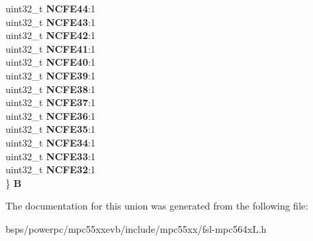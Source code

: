 \begin{DoxyCompactItemize}
\begin{tabbing}
\>uint32\_t {\bfseries NCFE44}:1\\
\>uint32\_t {\bfseries NCFE43}:1\\
\>uint32\_t {\bfseries NCFE42}:1\\
\>uint32\_t {\bfseries NCFE41}:1\\
\>uint32\_t {\bfseries NCFE40}:1\\
\>uint32\_t {\bfseries NCFE39}:1\\
\>uint32\_t {\bfseries NCFE38}:1\\
\>uint32\_t {\bfseries NCFE37}:1\\
\>uint32\_t {\bfseries NCFE36}:1\\
\>uint32\_t {\bfseries NCFE35}:1\\
\>uint32\_t {\bfseries NCFE34}:1\\
\>uint32\_t {\bfseries NCFE33}:1\\
\>uint32\_t {\bfseries NCFE32}:1\\
\} {\bfseries B}\\

\end{tabbing}\end{DoxyCompactItemize}


The documentation for this union was generated from the following file\+:\begin{DoxyCompactItemize}
\item 
bsps/powerpc/mpc55xxevb/include/mpc55xx/fsl-\/mpc564x\+L.\+h\end{DoxyCompactItemize}
